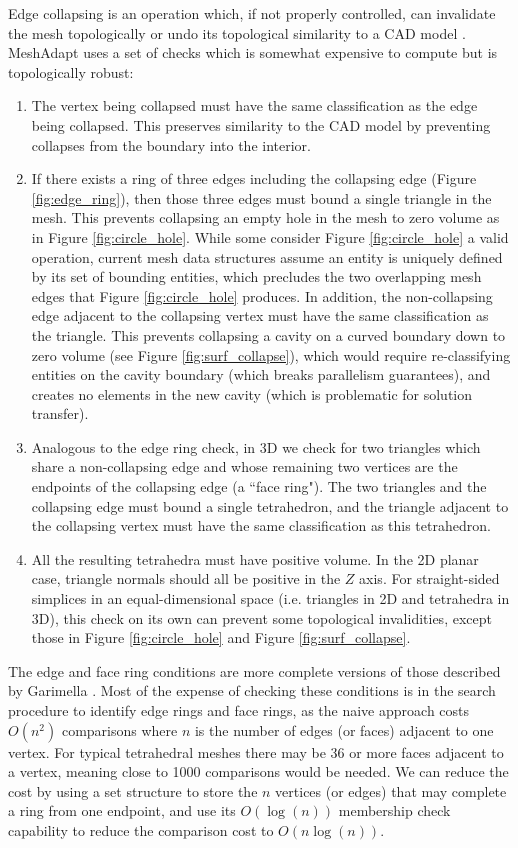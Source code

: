 Edge collapsing is an operation which, if not properly controlled,
can invalidate the mesh topologically or undo its topological similarity
to a CAD model \cite{schroeder1990combined}.
MeshAdapt uses a set of checks which is somewhat expensive to compute
but is topologically robust:

\begin{enumerate}
\item The vertex being collapsed must have the same classification as
the edge being collapsed. This preserves similarity to the CAD model by
preventing collapses from the boundary into the interior.
\item If there exists a ring of three edges including the collapsing edge
(Figure \ref{fig:edge_ring}),
then those three edges must bound a single triangle in the mesh.
This prevents collapsing an empty hole in the mesh to zero volume as in
Figure \ref{fig:circle_hole}.
While some \cite{beall1997general} consider Figure \ref{fig:circle_hole}
a valid operation, current mesh data structures assume an entity is uniquely
defined by its set of bounding entities, which precludes the two overlapping
mesh edges that Figure \ref{fig:circle_hole} produces.
In addition, the non-collapsing edge adjacent to the collapsing vertex must have the same
classification as the triangle.
This prevents collapsing a cavity on a curved boundary down to zero volume
(see Figure \ref{fig:surf_collapse}), which would require re-classifying
entities on the cavity boundary (which breaks parallelism guarantees), and
creates no elements in the new cavity (which is problematic for solution transfer).
\item Analogous to the edge ring check, in 3D we check for two triangles which
share a non-collapsing edge and whose remaining two vertices are the endpoints
of the collapsing edge (a ``face ring").
The two triangles and the collapsing edge must bound a single tetrahedron,
and the triangle adjacent to the collapsing vertex must have the same classification
as this tetrahedron.
\item All the resulting tetrahedra must have positive volume.
In the 2D planar case, triangle normals should all be positive in the $Z$ axis.
For straight-sided simplices in an equal-dimensional space (i.e. triangles in 2D
and tetrahedra in 3D), this check on its own can prevent some topological invalidities,
except those in Figure \ref{fig:circle_hole} and Figure \ref{fig:surf_collapse}.
\end{enumerate}

The edge and face ring conditions are more complete versions of those described
by Garimella \cite{garimella1999anisotropic}.
Most of the expense of checking these conditions is in the search procedure
to identify edge rings and face rings, as the naive approach costs $O(n^2)$
comparisons where $n$ is the number of edges (or faces) adjacent to one vertex.
For typical tetrahedral meshes there may be 36 or more faces adjacent to a vertex,
meaning close to 1000 comparisons would be needed.
We can reduce the cost by using a set structure to store the $n$ vertices (or edges)
that may complete a ring from one endpoint, and use its $O(\log(n))$ membership check
capability to reduce the comparison cost to $O(n\log(n))$.

